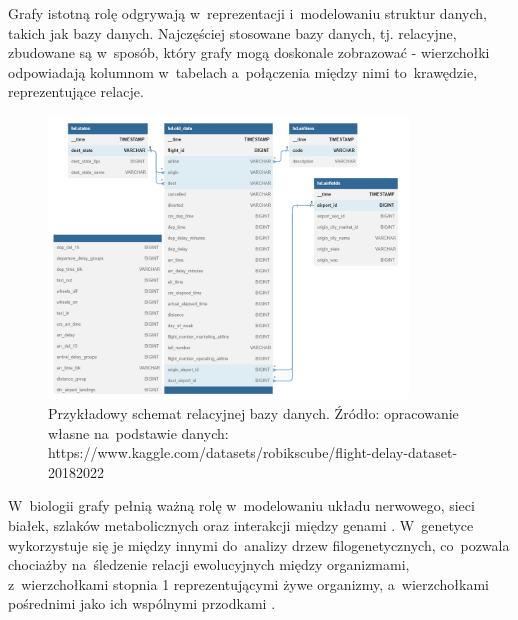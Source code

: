 Grafy istotną rolę odgrywają w~reprezentacji i~modelowaniu struktur danych, takich jak bazy danych.
Najczęściej stosowane bazy danych, tj. relacyjne, zbudowane są w~sposób, który grafy mogą doskonale zobrazować -
wierzchołki odpowiadają kolumnom w~tabelach a~połączenia między nimi to~krawędzie, reprezentujące relacje.

\begin{figure}[ht]
	\centering
	\includegraphics[height=7.5cm]{resources/introduction/images/database.png}
	\caption{Przykładowy schemat relacyjnej bazy danych.
		Źródło: opracowanie własne na~podstawie danych:
		https://www.kaggle.com/datasets/robikscube/flight-delay-dataset-20182022}
    \label{Fig:intro-2}
\end{figure}
\FloatBarrier

\clearpage

W~biologii grafy pełnią ważną rolę w~modelowaniu układu nerwowego, sieci białek,
szlaków metabolicznych oraz interakcji między genami \cite{Chung2021}.
W~genetyce wykorzystuje się je między innymi do~analizy drzew filogenetycznych,
co~pozwala chociażby na~śledzenie relacji ewolucyjnych między organizmami,
z~wierzchołkami stopnia 1 reprezentującymi żywe organizmy,
a~wierzchołkami pośrednimi jako ich wspólnymi przodkami \cite{Erciyes2023}.

